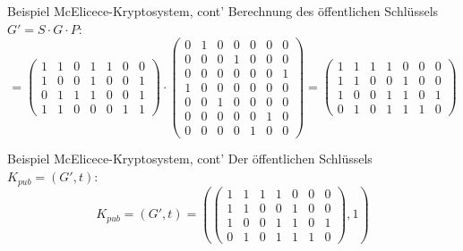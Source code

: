 \documentclass[11pt%
,aspectratio=169%
]{beamer}
\begin{document}
\begin{frame}{Beispiel McElicece-Kryptosystem, cont'}
Berechnung des öffentlichen Schlüssels $G' = S \cdot G \cdot P$:
$$
    =\begin{pmatrix} 1 & 1 & 0 & 1 & 1 & 0 & 0 \\ 1 & 0 & 0 & 1 & 0 & 0 & 1 \\ 0 & 1 & 1 & 1 & 0 & 0 & 1 \\ 1 & 1 & 0 & 0 & 0 & 1 & 1 \end{pmatrix} \cdot \begin{pmatrix} 0 & 1 & 0 & 0 & 0 & 0 & 0 \\ 0 & 0 & 0 & 1 & 0 & 0 & 0 \\ 0 & 0 & 0 & 0 & 0 & 0 & 1 \\ 1 & 0 & 0 & 0 & 0 & 0 & 0 \\ 0 & 0 & 1 & 0 & 0 & 0 & 0 \\ 0 & 0 & 0 & 0 & 0 & 1 & 0 \\ 0 & 0 & 0 & 0 & 1 & 0 & 0 \end{pmatrix}= \begin{pmatrix} 1 & 1 & 1 & 1 & 0 & 0 & 0 \\ 1 & 1 & 0 & 0 & 1 & 0 & 0 \\ 1 & 0 & 0 & 1 & 1 & 0 & 1 \\ 0 & 1 & 0 & 1 & 1 & 1 & 0 \end{pmatrix}
$$
\end{frame}

\begin{frame}{Beispiel McElicece-Kryptosystem, cont'}
Der öffentlichen Schlüssels $K_{pub} = (G',t)$:
$$
    K_{pub} = (G',t) =\left(\begin{pmatrix} 1 & 1 & 1 & 1 & 0 & 0 & 0 \\ 1 & 1 & 0 & 0 & 1 & 0 & 0 \\ 1 & 0 & 0 & 1 & 1 & 0 & 1 \\ 0 & 1 & 0 & 1 & 1 & 1 & 0 \end{pmatrix},1\right)
$$
\end{frame}
\end{document}
